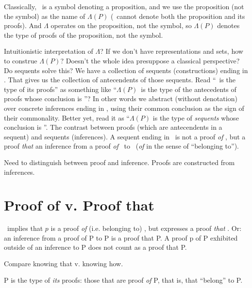 \documentclass{article}
\begin{document}
\begin{remark}
Classically, \PropP\ is a symbol
denoting a proposition, and we use the proposition (not the symbol) as
the name of \(\Lambda(P)\) (\PropP\ cannot denote both the proposition
and its proofs). And \(\Lambda\) operates on the proposition, not the
symbol, so \(\Lambda(P)\) denotes the type of proofs of the
proposition, not the symbol.
\end{remark}

\begin{remark}
Intuitionistic interpretation of \(\Lambda\)?  If we don't have
representations and sets, how to construe \(\Lambda(P)\)?  Doesn't the
whole idea presuppose a classical perspective?  Do sequents solve
this?  We have a collection of sequents (constructions) ending in
\PropP.  That gives us the collection of antecendents of those
sequents.  Read ``\PropP\ is the type of its proofs'' as something
like ``\(\Lambda(P)\)\ is the type of the antecedents of proofs whose
conclusion is \PropP''?  In other words we abstract (without
denotation) over concrete inferences ending in \PropP, using their
common conclusion as the sign of their commonality.  Better yet, read
it as ``\(\Lambda(P)\) is the type of \emph{sequents} whose conclusion
is \PropP''.  The contrast between proofs (which are antecendents in a
sequent) and sequents (inferences).  A sequent ending in \PropP\ is
not a proof \emph{of} \PropP, but a proof \emph{that} \PropP{:} an
inference from a proof \emph{of} \PropP\ to \PropP\ (\emph{of} in the
sense of ``belonging to'').
\end{remark}

\begin{remark}
Need to distinguish between proof and inference.  Proofs are
constructed from inferences.
\end{remark}

\section{Proof of v. Proof that}

\pP\ implies that \(p\) is a proof \emph{of} (i.e. belonging to)
\PropP, but expresses a proof \emph{that} \PropP.  Or: an inference
from a proof of P to P is a proof that P.  A proof p of P exhibited
outside of an inference to P does not count as a proof that P.

Compare knowing that v. knowing how.

P is the type of \emph{its} proofs: those that are proof \emph{of} P,
that is, that ``belong'' to P.
\end{document}
